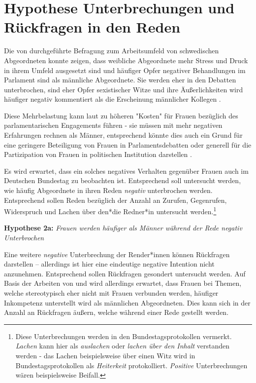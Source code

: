 \documentclass[12pt, 
    twoside=false, 
    bibliography=totoc, 
    numbers=endperiod, 
    headings=normal, 
    toc=chapterentrydotfill
    ]{scrbook}
\begin{document}
\section{Hypothese Unterbrechungen und Rückfragen in den Reden}


Die von \textcite{erikson_2018} durchgeführte Befragung zum Arbeitsumfeld von schwedischen Abgeordneten konnte zeigen, dass weibliche Abgeordnete mehr Stress und Druck in ihrem Umfeld ausgesetzt sind und häufiger Opfer negativer Behandlungen im Parlament sind als männliche Abgeordnete. Sie werden eher in den Debatten unterbrochen, sind eher Opfer sexistischer Witze und ihre Äußerlichkeiten wird häufiger negativ kommentiert als die Erscheinung männlicher Kollegen \parencite[13]{erikson_2018}.


Diese Mehrbelastung kann laut \textcite{erikson_2018} zu höheren "Kosten" für Frauen bezüglich des parlamentarischen Engagements führen - sie müssen mit mehr negativen Erfahrungen rechnen als Männer, entsprechend könnte dies auch ein Grund für eine geringere Beteiligung von Frauen in Parlamentsdebatten oder generell für die Partizipation von Frauen in politischen Institution darstellen \parencites[vgl.][]{erikson_2018}[vgl.][]{back_2014}.

Es wird erwartet, dass ein solches negatives Verhalten gegenüber Frauen auch im Deutschen Bundestag zu beobachten ist. Entsprechend soll untersucht werden, wie häufig Abgeordnete in ihren Reden \emph{negativ} unterbrochen werden. Entsprechend sollen Reden bezüglich der Anzahl an Zurufen, Gegenrufen, Widerspruch und Lachen über den*die Redner*in untersucht werden.\footnote{Diese Unterbrechungen werden in den Bundestagsprotokollen vermerkt. \emph{Lachen} kann hier als \emph{auslachen} oder \emph{lachen über den Inhalt} verstanden werden - das Lachen beispielsweise über einen Witz wird in Bundestagsprotokollen als \emph{Heiterkeit} protokolliert. \emph{Positive} Unterbrechungen wären beispielsweise Beifall.}

\textbf{Hypothese 2a:} \emph{Frauen werden häufiger als Männer während der Rede negativ Unterbrochen}

Eine weitere \emph{negative} Unterbrechung der Render*innen können Rückfragen darstellen -- allerdings ist hier eine eindeutige negative Intention nicht anzunehmen. Entsprechend sollen Rückfragen gesondert untersucht werden. Auf Basis der Arbeiten von \textcite{brescoll_2011} und \textcite{eagly_2002}  wird allerdings erwartet, dass Frauen bei Themen, welche stereotypisch eher nicht mit Frauen verbunden werden, häufiger Inkompetenz unterstellt wird als männlichen Abgeordneten. Dies kann sich in der Anzahl an Rückfragen äußern, welche während einer Rede gestellt werden. 
\end{document}
